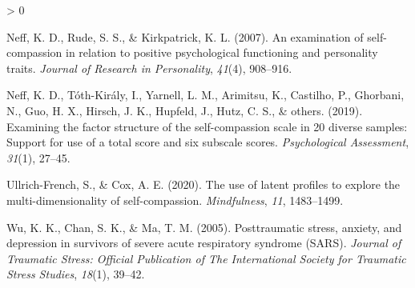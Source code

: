 \documentclass[
  english,
  man,floatsintext]{apa7}
\newlength{\cslhangindent}
\newenvironment{CSLReferences}[2] %
 {%
  \setlength{\parindent}{0pt}
  \ifodd #1 \everypar{\setlength{\hangindent}{\cslhangindent}}\ignorespaces\fi
  \ifnum #2 > 0
  \setlength{\parskip}{#2\baselineskip}
  \fi
 }%
 {}
\begin{document}
\begin{appendix}
\begin{CSLReferences}{1}{0}
\leavevmode\hypertarget{ref-neff2007examination}{}%
Neff, K. D., Rude, S. S., \& Kirkpatrick, K. L. (2007). An examination
of self-compassion in relation to positive psychological functioning and
personality traits. \emph{Journal of Research in Personality},
\emph{41}(4), 908--916.

\leavevmode\hypertarget{ref-neff2019examining}{}%
Neff, K. D., Tóth-Király, I., Yarnell, L. M., Arimitsu, K., Castilho,
P., Ghorbani, N., Guo, H. X., Hirsch, J. K., Hupfeld, J., Hutz, C. S.,
\& others. (2019). Examining the factor structure of the self-compassion
scale in 20 diverse samples: Support for use of a total score and six
subscale scores. \emph{Psychological Assessment}, \emph{31}(1), 27--45.

\leavevmode\hypertarget{ref-ullrich2020use}{}%
Ullrich-French, S., \& Cox, A. E. (2020). The use of latent profiles to
explore the multi-dimensionality of self-compassion. \emph{Mindfulness},
\emph{11}, 1483--1499.

\leavevmode\hypertarget{ref-wu2005posttraumatic}{}%
Wu, K. K., Chan, S. K., \& Ma, T. M. (2005). Posttraumatic stress,
anxiety, and depression in survivors of severe acute respiratory
syndrome (SARS). \emph{Journal of Traumatic Stress: Official Publication
of The International Society for Traumatic Stress Studies},
\emph{18}(1), 39--42.

\end{CSLReferences}
\end{appendix}
\end{document}
